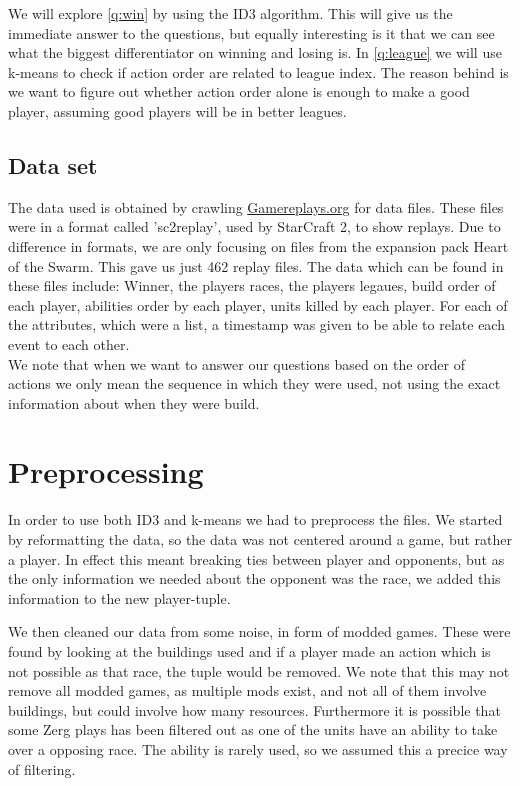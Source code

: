 \documentclass[a4paper,11pt]{article}
\begin{document}
We will explore \ref{q:win} by using the ID3 algorithm. This will give us the immediate answer to the questions, but equally interesting is it that we can see what the biggest differentiator on winning and losing is. In \ref{q:league} we will use k-means  to check if action order are related to league index. The reason behind is we want to figure out whether action order alone is enough to make a good player, assuming good players will be in better leagues.

\subsection{Data set}
The data used is obtained by crawling \url{Gamereplays.org} for data files.
These files were in a format called 'sc2replay', used by StarCraft 2, to show replays. Due to difference in formats, we are only focusing on files from the expansion pack Heart of the Swarm. This gave us just 462 replay files. The data which can be found in these files include: Winner, the players races, the players legaues, build order of each player, abilities order by each player, units killed by each player.
For each of the attributes, which were a list, a timestamp was given to be able to relate each event to each other.\\

We note that when we want to answer our questions based on the order of actions we only mean the sequence in which they were used, not using the exact information about when they were build.

\section{Preprocessing}
In order to use both ID3 and k-means we had to preprocess the files. We started by reformatting the data, so the data was not centered around a game, but rather a player.
In effect this meant breaking ties between player and opponents, but as the only information we needed about the opponent was the race, we added this information to the new player-tuple.

We then cleaned our data from some noise, in form of modded games. These were found by looking at the buildings used and if a player made an action which is not possible as that race, the tuple would be removed. We note that this may not remove all modded games, as multiple mods exist, and not all of them involve buildings, but could involve how many resources. Furthermore it is possible that some Zerg plays has been filtered out as one of the units have an ability to take over a opposing race. The ability is rarely used, so we assumed this a precice way of filtering.
\end{document}
